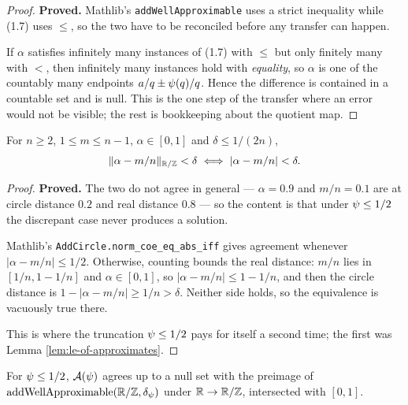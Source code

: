 \begin{proof}
  \leanok
  \textbf{Proved.} Mathlib's \texttt{addWellApproximable} uses a strict inequality while
  (1.7) uses $\leq$, so the two have to be reconciled before any transfer can happen.

  If $\alpha$ satisfies infinitely many instances of (1.7) with $\leq$ but only finitely
  many with $<$, then infinitely many instances hold with \emph{equality}, so $\alpha$ is
  one of the countably many endpoints $a/q \pm \psi(q)/q$. Hence the difference is
  contained in a countable set and is null. This is the one step of the transfer where an
  error would not be visible; the rest is bookkeeping about the quotient map.
\end{proof}

\begin{lemma}
  \label{lem:circle-norm}
  \leanok
  For $n \geq 2$, $1 \leq m \leq n-1$, $\alpha \in [0,1]$ and $\delta \leq 1/(2n)$,
  \[ \|\alpha - m/n\|_{\mathbb{R}/\mathbb{Z}} < \delta \iff |\alpha - m/n| < \delta. \]
\end{lemma}

\begin{proof}
  \leanok
  \textbf{Proved.} The two do not agree in general --- $\alpha = 0.9$ and $m/n = 0.1$ are
  at circle distance $0.2$ and real distance $0.8$ --- so the content is that under
  $\psi \leq 1/2$ the discrepant case never produces a solution.

  Mathlib's \texttt{AddCircle.norm\_coe\_eq\_abs\_iff} gives agreement whenever
  $|\alpha - m/n| \leq 1/2$. Otherwise, counting bounds the real distance:
  $m/n$ lies in $[1/n, 1 - 1/n]$ and $\alpha \in [0,1]$, so
  $|\alpha - m/n| \leq 1 - 1/n$, and then the circle distance is
  $1 - |\alpha - m/n| \geq 1/n > \delta$. Neither side holds, so the equivalence is
  vacuously true there.

  This is where the truncation $\psi \leq 1/2$ pays for itself a second time; the first
  was Lemma \ref{lem:le-of-approximates}.
\end{proof}

\begin{lemma}
  \label{lem:transfer}
  \leanok
  For $\psi \leq 1/2$, $\mathcal{A}(\psi)$ agrees up to a null set with the preimage of
  $\mathrm{addWellApproximable}(\mathbb{R}/\mathbb{Z}, \delta_\psi)$ under $\mathbb{R} \to \mathbb{R}/\mathbb{Z}$,
  intersected with $[0,1]$.
\end{lemma}

